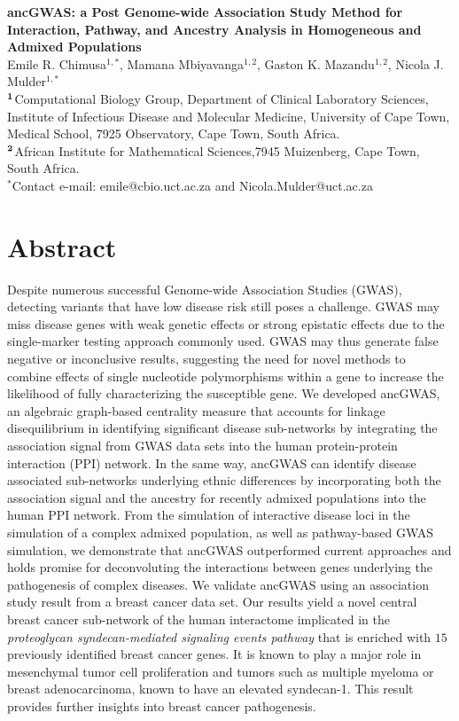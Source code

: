 \documentclass[10pt]{article}
\date{}
\begin{document}
\begin{flushleft}
{\Large
\textbf{ancGWAS: a Post Genome-wide Association Study Method for Interaction, Pathway, and Ancestry Analysis in Homogeneous and Admixed Populations}
}
\\
\vskip5mm
Emile R. Chimusa$^{1,\ast}$, 
Mamana Mbiyavanga$^{1,2}$, 
Gaston K. Mazandu$^{1,2}$,
Nicola J. Mulder$^{1,\ast}$
\\
\vskip5mm
$^{\bf{1}}$Computational Biology Group, Department of Clinical Laboratory Sciences, Institute of Infectious Disease and Molecular Medicine, University of Cape Town, Medical School, 7925 Observatory, Cape Town, South Africa.\\
$^{\bf{2}}$African Institute for Mathematical Sciences,7945 Muizenberg, Cape Town, South Africa.
\\
\vskip5mm
$^{\ast}$Contact e-mail: emile@cbio.uct.ac.za and Nicola.Mulder@uct.ac.za
\end{flushleft}

\section*{Abstract}

Despite numerous successful Genome-wide Association Studies (GWAS), detecting variants that have low disease risk still poses a challenge. GWAS may miss disease genes with weak genetic effects or strong epistatic effects due to the single-marker testing approach commonly used. GWAS may thus generate false negative or inconclusive results, suggesting the need for novel methods to combine effects of single nucleotide polymorphisms within a gene to increase the likelihood of fully characterizing the susceptible gene. We developed ancGWAS, an algebraic graph-based centrality measure that accounts for linkage disequilibrium in identifying significant disease sub-networks by integrating the association signal from GWAS data sets into the human protein-protein interaction (PPI) network. In the same way, ancGWAS can identify disease associated sub-networks underlying ethnic differences by incorporating both the association signal and the ancestry for recently admixed populations into the human PPI network. From the simulation of interactive disease loci in the simulation of a complex admixed population, as well as pathway-based GWAS simulation, we demonstrate that ancGWAS outperformed current approaches and holds promise for deconvoluting the interactions between genes underlying the pathogenesis of complex diseases. We validate ancGWAS using an association study result from a breast cancer data set. Our results yield a novel central breast cancer sub-network of the human interactome implicated in the \textit{proteoglycan syndecan-mediated signaling events pathway} that is enriched with $15$ previously identified breast cancer genes. It is known to play a major role in mesenchymal tumor cell proliferation and tumors such as multiple myeloma or breast adenocarcinoma, known to have an elevated syndecan-1. This result provides further insights into breast cancer pathogenesis.
\end{document}
